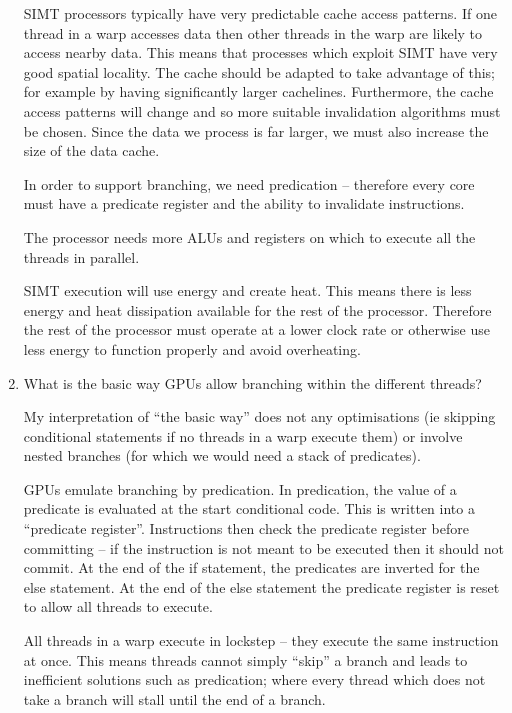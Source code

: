 \documentclass[10pt,\jkfside,a4paper]{article}
\begin{document}
\begin{enumerate}
SIMT processors typically have very predictable cache access patterns. If
one thread in a warp accesses data then other threads in the warp are likely
to access nearby data. This means that processes which exploit SIMT have
very good spatial locality. The cache should be adapted to take advantage of
this; for example by having significantly larger cachelines. Furthermore, the
cache access patterns will change and so more suitable invalidation
algorithms must be chosen. Since the data we process is far larger, we must
also increase the size of the data cache.

In order to support branching, we need predication -- therefore every
core must have a predicate register and the ability to invalidate instructions.

The processor needs more ALUs and registers on which to execute all the
threads in parallel.

SIMT execution will use energy and create heat. This means there is less
energy and heat dissipation available for the rest of the processor.
Therefore the rest of the processor must operate at a lower clock rate or
otherwise use less energy to function properly and avoid overheating.

\item What is the basic way GPUs allow branching within the different threads?

My interpretation of ``the basic way'' does not any optimisations (ie
skipping conditional statements if no threads in a warp execute them) or
involve nested branches (for which we would need a stack of predicates).

GPUs emulate branching by predication. In predication, the value of a
predicate is evaluated at the start conditional code. This is written into a
``predicate register''. Instructions then check the predicate register
before committing -- if the instruction is not meant to be executed then it
should not commit. At the end of the if statement, the predicates are
inverted for the else statement. At the end of the else statement the
predicate register is reset to allow all threads to execute.

All threads in a warp execute in lockstep -- they execute the same
instruction at once. This means threads cannot simply ``skip'' a branch and
leads to inefficient solutions such as predication; where every thread
which does not take a branch will stall until the end of a branch.

\begin{enumerate}[label=(\alph*)]


\end{enumerate}
\end{enumerate}
\end{document}
